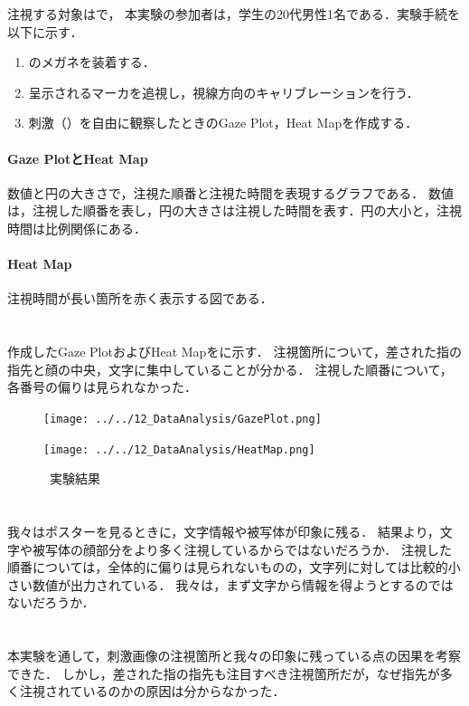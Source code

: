 注視する対象はで，
本実験の参加者は，学生の20代男性1名である．実験手続を以下に示す．
\begin{enumerate}
    \renewcommand{\labelenumi}{\fbox{\theenumi}}
    \item \tobi のメガネを装着する．
    \item 呈示されるマーカを追視し，視線方向のキャリブレーションを行う．
    \item 刺激（）を自由に観察したときのGaze Plot，Heat Mapを作成する．
\end{enumerate}
\paragraph{Gaze PlotとHeat Map}
数値と円の大きさで，注視た順番と注視た時間を表現するグラフである．
数値は，注視した順番を表し，円の大きさは注視した時間を表す．円の大小と，注視時間は比例関係にある．
\paragraph{Heat Map}
注視時間が長い箇所を赤く表示する図である．
\clearpage
\section{\result}
作成したGaze PlotおよびHeat Mapをに示す．
注視箇所について，差された指の指先と顔の中央，文字に集中していることが分かる．
注視した順番について，各番号の偏りは見られなかった．
\begin{figure}[H]
    \centering
    \begin{minipage}[b]{.48\textwidth}
        \centering
        \texttt{[image: ../../12\_DataAnalysis/GazePlot.png]}
    \end{minipage}
    \begin{minipage}[b]{.48\textwidth}
        \centering
        \texttt{[image: ../../12\_DataAnalysis/HeatMap.png]}
    \end{minipage}
    \caption{\kadaid \ 実験結果}
    \label{fig:実験結果\kadaid}
\end{figure}
\section{\consideration}
我々はポスターを見るときに，文字情報や被写体が印象に残る．
結果より，文字や被写体の顔部分をより多く注視しているからではないだろうか．
注視した順番については，全体的に偏りは見られないものの，文字列に対しては比較的小さい数値が出力されている．
我々は，まず文字から情報を得ようとするのではないだろうか．
\section{\conclusion}
本実験を通して，刺激画像の注視箇所と我々の印象に残っている点の因果を考察できた．
しかし，差された指の指先も注目すべき注視箇所だが，なぜ指先が多く注視されているのかの原因は分からなかった．